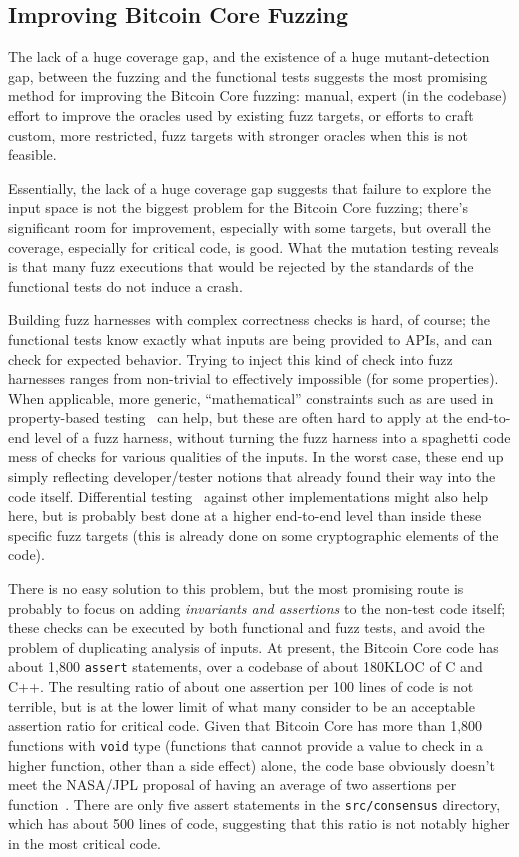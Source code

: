 \subsection{Improving Bitcoin Core Fuzzing}

The lack of a huge coverage gap, and the existence of a huge
mutant-detection gap, between the fuzzing and the functional tests
suggests the most promising method for improving the Bitcoin Core
fuzzing: manual, expert (in the codebase) effort to improve the
oracles used by existing fuzz targets, or efforts to craft custom,
more restricted, fuzz targets with stronger oracles when this is not
feasible.

Essentially, the lack of a huge coverage gap suggests that failure to
explore the input space is not the biggest problem for the Bitcoin
Core fuzzing; there's significant room for improvement, especially
with some targets, but overall the coverage, especially for critical
code, is good.  What the mutation testing reveals is that many fuzz
executions that would be rejected by the standards of the functional
tests do not induce a crash.

Building fuzz harnesses with complex correctness checks is hard, of
course; the functional tests know exactly what inputs are being
provided to APIs, and can check for expected behavior.  Trying to
inject this kind of check into fuzz harnesses ranges from non-trivial
to effectively impossible (for some properties).  When
applicable, more generic, ``mathematical'' constraints such as are
used in property-based testing~\cite{ClaessenH00} can help, but these
are often hard to apply at the end-to-end level of a fuzz harness,
without turning the fuzz harness into a spaghetti code mess of
checks for various qualities of the inputs.  In the worst case, these
end up simply reflecting developer/tester notions that already found
their way into the code itself.  Differential testing~\cite{Differential} against other
implementations might also help here, but is probably best done at a
higher end-to-end level than inside these specific fuzz targets (this
is already done on some cryptographic elements of the code).

There is no
easy solution to this problem, but the most promising route is
probably to focus
on adding \emph{invariants and assertions} to the non-test code itself; these checks can be executed by
both functional and fuzz tests, and avoid the problem of duplicating
analysis of inputs.  At
present, the Bitcoin Core code has about 1,800 {\tt assert}
statements, over a codebase of about 180KLOC of C and C++.  The resulting ratio
of about one assertion per 100 lines of code is not terrible, but is
at the lower limit of what many consider to be an acceptable assertion
ratio for critical code.
Given that Bitcoin Core has more than 1,800 functions with {\tt void}
type (functions that cannot provide a value to check in a higher
function, other than a side effect) alone, the code base obviously
doesn't meet the NASA/JPL proposal of having an average of two
assertions per function~\cite{holzmann2006power}.  There are only five assert
statements in the {\tt src/consensus} directory, which has about 500
lines of code, suggesting that this ratio is not notably higher in the
most critical code.

